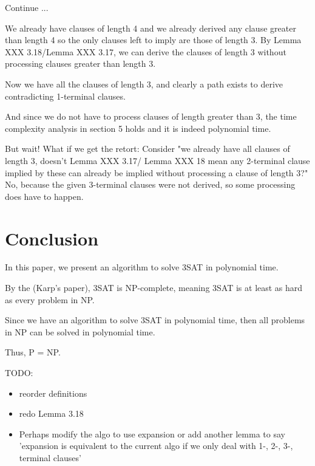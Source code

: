 \documentclass[manuscript]{acmart}
\begin{document}
    Continue ...

    We already have clauses of length 4 and we already derived any clause greater
    than length 4 so the only clauses left to imply are those of length 3.
    By Lemma XXX 3.18/Lemma XXX 3.17, we can derive the clauses of length 3 without processing
    clauses greater than length 3. 

    Now we have all the clauses of length 3, and clearly a path exists to derive
    contradicting 1-terminal clauses.

    And since we do not have to process clauses of length greater than 3, the 
    time complexity analysis in section 5 holds and it is indeed polynomial time.

    But wait! What if we get the retort: 
    Consider "we already have all clauses of length 3, doesn't Lemma XXX 3.17/ Lemma XXX 18 mean
    any 2-terminal clause implied by these can already be implied without 
    processing a clause of length 3?"
    No, because the given 3-terminal clauses were not derived, so some processing
    does have to happen.


    \section{Conclusion} 

    In this paper, we present an algorithm to solve 3SAT in polynomial time.

    By the (Karp's paper), 3SAT is NP-complete, meaning 3SAT is at least
    as hard as every problem in NP.
    
    Since we have an algorithm to solve 3SAT in polynomial time, then all problems
    in NP can be solved in polynomial time.

    Thus, P = NP. 


    TODO:
    \begin{itemize}
        \item reorder definitions
        \item redo Lemma 3.18
        \item Perhaps modify the algo to use expansion or add another lemma
        to say 'expansion is equivalent to the current algo if we only deal with
        1-, 2-, 3-, terminal clauses'
    \end{itemize}
\end{document}
